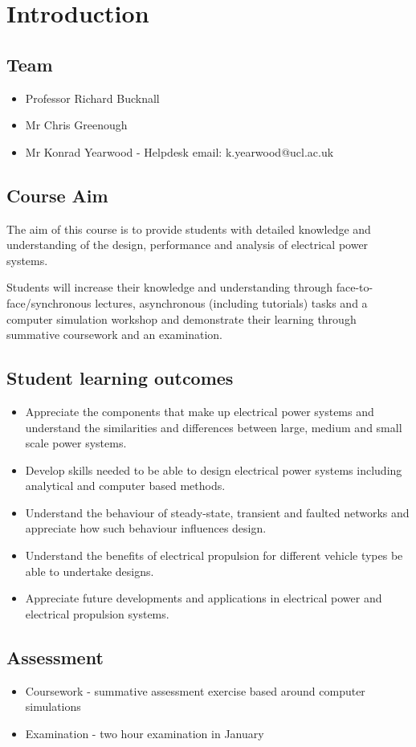 \chapter{Introduction}
\section{Team}
\begin{itemize}
	\item Professor Richard Bucknall
	\item Mr Chris Greenough
	\item Mr Konrad Yearwood - Helpdesk email: k.yearwood@ucl.ac.uk
\end{itemize}
\section{Course Aim}
The aim of this course is to provide students with detailed knowledge and understanding of the design, performance and analysis of electrical power systems.

Students will increase their knowledge and understanding through face-to-face/synchronous lectures, asynchronous (including tutorials) tasks and a computer simulation workshop and demonstrate their learning through summative coursework and an examination.
\section{Student learning outcomes}
\begin{itemize}
	\item Appreciate the components that make up electrical power systems and understand the similarities and differences between large, medium and small scale power systems.
	\item Develop skills needed to be able to design electrical power systems including analytical and computer based methods.
	\item Understand the behaviour of steady-state, transient and faulted networks and appreciate how such behaviour influences design.
	\item Understand the benefits of electrical propulsion for different vehicle types be able to undertake designs.
	\item Appreciate future developments and applications in electrical power and electrical propulsion systems.
\end{itemize}
\section{Assessment}
\begin{itemize}
	\item Coursework - summative assessment exercise based around computer simulations
	\item Examination - two hour examination in January
\end{itemize}

